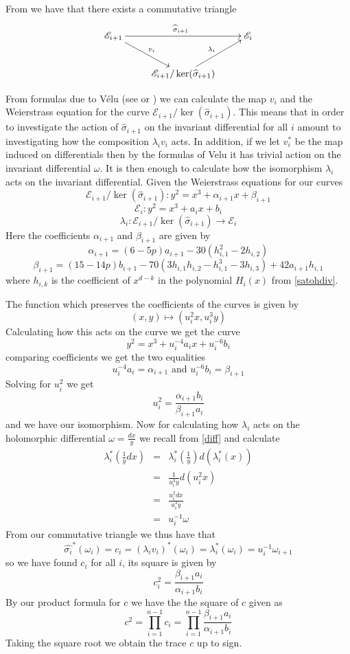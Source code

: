 From \cite{AEC} we have that there exists a commutative triangle
$$
\xymatrix{
  \mathscr{E}_{i+1} \ar[rr]^{\widehat{\sigma}_{i+1}} \ar[dr]^{v_{i}} && \mathscr{E}_i \\
  & \mathscr{E}_{i+1}/\ker(\widehat{\sigma}_{i+1}) \ar[ur]^{\lambda_i} & 
}
$$

From formulas due to V\'{e}lu (see \cite{Velu} or \cite{Sato}) we can calculate the map
$v_i$ and the Weierstrass equation for the curve $\mathscr{E}_{i+1}/\ker(\widehat{\sigma}_{i+1})$.
This means that in order to investigate the action of
$\widehat{\sigma}_{i+1}$ on the invariant differential for all $i$ amount to investigating
how the composition $\lambda_i v_i$ acts. In addition, if we let $v_i^*$ be the map induced 
on differentials then by the formulas of Velu it has trivial action on the invariant differential $\omega$.
It is then enough to calculate how the isomorphism $\lambda_i$ acts on the invariant differential. 
Given the Weierstrass equations for our curves
$$ \mathscr{E}_{i+1}/\ker(\widehat{\sigma}_{i+1}): y^2 = x^3 + \alpha_{i+1}x + \beta_{i+1}$$
$$ \mathscr{E}_i: y^2 = x^3 + a_i x + b_i $$
$$ \lambda_i: \mathscr{E}_{i+1}/\ker(\widehat{\sigma}_{i+1}) \rightarrow \mathscr{E}_i $$
Here the coefficients $\alpha_{i+1}$ and $\beta_{i+1}$ are given by
$$\alpha_{i+1} = (6-5p)a_{i+1}-30(h_{i,1}^2-2h_{i,2})$$
$$\beta_{i+1}  = (15-14p)b_{i+1}-70(3h_{i,1}h_{i,2}-h_{i,1}^3-3h_{i,3})+42a_{i+1}h_{i,1}$$
where $h_{i,k}$ is the coefficient of $x^{d-k}$ in the polynomial $H_i(x)$ from \ref{satohdiv}.

The function which preserves the coefficients of the curves is given by
$$(x,y) \mapsto (u_i^2 x, u_i^3 y) $$
Calculating how this acts on the curve we get the curve
$$ y^2 = x^3 + u_i^{-4} a_i x + u_i^{-6} b_i$$
comparing coefficients we get the two equalities
$$ u_i^{-4} a_i = \alpha_{i+1} \text{ and } u_i^{-6} b_i = \beta_{i+1} $$
Solving for $u_i^2$ we get
$$ u_i^2 = \frac{\alpha_{i+1} b_i}{\beta_{i+1} a_i} $$
and we have our isomorphism. Now for calculating how $\lambda_i$ acts on the holomorphic
differential $\omega=\frac{dx}{y}$ we recall from \ref{diff} and calculate
\begin{eqnarray}
 \lambda_i^*(\frac{1}{y} dx) &=& \lambda_i^*(\frac{1}{y}) d(\lambda_i^*(x)) \nonumber \\
			     &=& \frac{1}{u_i^3 y} d(u_i^2 x) \nonumber \\
			     &=& \frac{u_i^2 dx}{u_i^3 y} \nonumber \\
			     &=& u_i^{-1} \omega \nonumber
\end{eqnarray}
From our commutative triangle we thus have that
$$ \widehat{\sigma_i}^*(\omega_i) = c_i = (\lambda_i v_i)^*(\omega_i) = \lambda_i^*(\omega_i) = u_i^{-1}\omega_{i+1}$$
so we have found $c_i$ for all $i$, its square is given by
$$ c_i^2 = \frac{\beta_{i+1} a_i}{\alpha_{i+1} b_i} $$
By our product formula for $c$ we have the the square of $c$ given as
$$ c^2 = \prod_{i=1}^{n-1} c_i = \prod_{i=1}^{n-1} \frac{\beta_{i+1} a_i}{\alpha_{i+1} b_i} $$
Taking the square root we obtain the trace $c$ up to sign.

